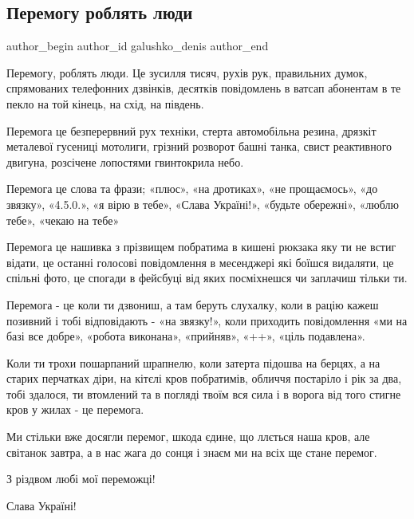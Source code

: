  
 
 
 
 

\subsection{Перемогу роблять люди}
\label{sec:24_12_2022.fb.galushko_denis.1.peremogu__roblyat_ly}

\ifcmt
 author_begin
   author_id galushko_denis
 author_end
\fi

Перемогу, роблять люди. Це зусилля тисяч, рухів рук, правильних думок,
спрямованих телефонних дзвінків, десятків повідомлень в ватсап абонентам в те
пекло на той кінець, на схід, на південь.

Перемога це безперервний рух техніки, стерта автомобільна резина, дрязкіт
металевої гусениці мотолиги, грізний розворот башні танка, свист реактивного
двигуна, розсічене лопостями гвинтокрила небо. 

Перемога це слова та фрази; «плюс», «на дротиках», «не прощаємось», «до
звязку», «4.5.0.», «я вірю в тебе», «Слава Україні!», «будьте обережні», «люблю
тебе», «чекаю на тебе»

Перемога це нашивка з прізвищем побратима в кишені рюкзака яку ти не встиг
відати, це останні голосові повідомлення в месенджері які боїшся видаляти, це
спільні фото, це спогади в фейсбуці від яких посміхнешся чи заплачиш тільки ти. 

Перемога - це коли ти дзвониш, а там беруть слухалку, коли в рацію кажеш
позивний і тобі відповідають - «на звязку!», коли приходить повідомлення «ми на
базі все добре», «робота виконана», «прийняв», «++», «ціль подавлена».

Коли ти трохи пошарпаний шрапнелю, коли затерта підошва на берцях, а на старих
перчатках діри, на кітєлі кров побратимів, обличчя постаріло і рік за два,
тобі здалося, ти втомлений та в погляді твоїм вся сила і в ворога від того
стигне кров у жилах - це перемога.

Ми стільки вже досягли перемог, шкода єдине, що ллється наша кров, але світанок
завтра, а в нас жага до сонця і знаєм ми на всіх ще стане перемог. 

З різдвом любі мої переможці!

Слава Україні!

